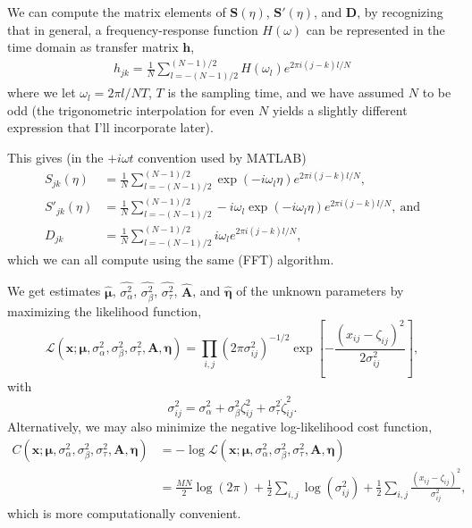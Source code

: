 \documentclass[aps, prb, onecolumn, floatfix, amssymb, superscriptaddress, nofootinbib, longbibliography]{revtex4-2}
\begin{document}
We can compute the matrix elements of $\mathbf{S}(\eta)$, $\mathbf{S}'(\eta)$, and $\mathbf{D}$, by recognizing that in general, a frequency-response function $H(\omega)$ can be represented in the time domain as transfer matrix $\mathbf{h}$,
\begin{align}
h_{jk} = \frac{1}{N}\sum_{l = -(N-1)/2}^{(N-1)/2} H(\omega_l)e^{2\pi i(j-k)l/N}
\end{align}
where we let $\omega_l = 2\pi l/NT$, $T$ is the sampling time, and we have assumed $N$ to be odd (the trigonometric interpolation for even $N$ yields a slightly different expression that I'll incorporate later).

This gives (in the $+i\omega t$ convention used by MATLAB)
\begin{align}
S_{jk}(\eta) &= \frac{1}{N}\sum_{l = -(N-1)/2}^{(N-1)/2} \exp(-i\omega_l\eta)e^{2\pi i(j-k)l/N},\label{eq:sjk}\\
S'_{jk}(\eta) &= \frac{1}{N}\sum_{l = -(N-1)/2}^{(N-1)/2} -i\omega_l\exp(-i\omega_l\eta)e^{2\pi i(j-k)l/N},\ \text{and}\label{eq:sdotjk}\\
D_{jk} &= \frac{1}{N}\sum_{l = -(N-1)/2}^{(N-1)/2} i\omega_l e^{2\pi i(j-k)l/N},\label{eq:djk}
\end{align}
which we can all compute using the same (FFT) algorithm.

We get estimates $\boldsymbol{\hat{\mu}}$, $\widehat{\sigma_\alpha^2}$, $\widehat{\sigma_\beta^2}$, $\widehat{\sigma_\tau^2}$, $\mathbf{\hat{A}}$, and $\boldsymbol{\hat{\eta}}$ of the unknown parameters by maximizing the likelihood function,
\begin{equation}
\mathcal{L}(\mathbf{x};\boldsymbol{\mu},\sigma_\alpha^2,\sigma_\beta^2,\sigma_\tau^2,\mathbf{A},\boldsymbol{\eta}) = \prod_{i,j}\left(2\pi\sigma_{ij}^2\right)^{-1/2}
\exp\left[-\frac{(x_{ij} - \zeta_{ij})^2}{2\sigma_{ij}^2}\right],\label{eq:likelihood}
\end{equation}
with
\begin{equation}
\sigma_{ij}^2 = \sigma_\alpha^2 + \sigma_\beta^2\zeta_{ij}^2 + \sigma_\tau^2\dot{\zeta}_{ij}^2.\label{eq:noisevar}
\end{equation}
Alternatively, we may also minimize the negative log-likelihood cost function,
\begin{align}
C(\mathbf{x};\boldsymbol{\mu},\sigma_\alpha^2,\sigma_\beta^2,\sigma_\tau^2,\mathbf{A},\boldsymbol{\eta}) &=-\log\mathcal{L}(\mathbf{x};\boldsymbol{\mu},\sigma_\alpha^2,\sigma_\beta^2,\sigma_\tau^2,\mathbf{A},\boldsymbol{\eta})\nonumber\\
&= \frac{MN}{2}\log(2\pi) + \frac{1}{2}\sum_{i,j}\log(\sigma_{ij}^2) + \frac{1}{2}\sum_{i,j}\frac{(x_{ij} - \zeta_{ij})^2}{\sigma_{ij}^2},\label{eq:nll}
\end{align}
which is more computationally convenient.
\end{document}
